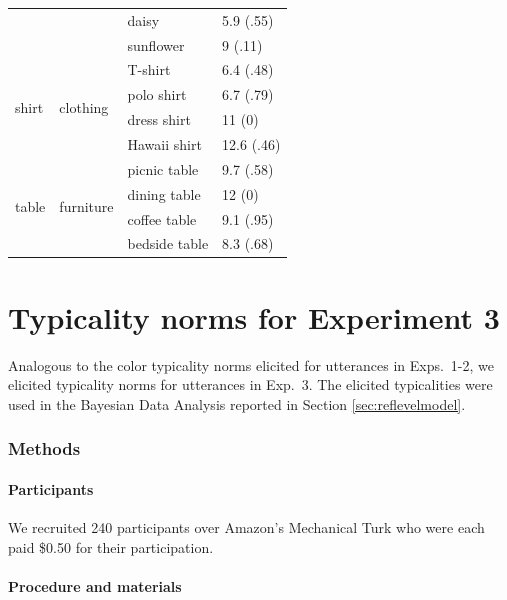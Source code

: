 \documentclass[11pt]{article}
\newcommand{\sectionref}[1]{Section \ref{#1}}
\begin{document}
\begin{table}
\begin{tabular}{l l l l}
		& & daisy & 5.9 (.55)\\
		& & sunflower & 9 (.11)\\
	\midrule
	\multirow{4}{*}{shirt} & \multirow{4}{*}{clothing} & T-shirt & 6.4 (.48)\\
		& & polo shirt & 6.7 (.79)\\
		& & dress shirt & 11 (0)\\
		& & Hawaii shirt & 12.6 (.46)\\
	\midrule
	\multirow{4}{*}{table} & \multirow{4}{*}{furniture} & picnic table & 9.7 (.58)\\
		& & dining table & 12 (0)\\
		& & coffee table & 9.1 (.95)\\
		& & bedside table & 8.3 (.68)\\				
	\bottomrule
	\end{tabular}
\end{table}


\section{Typicality norms for Experiment 3}
\label{app:typicalitynorms2}

Analogous to the color typicality norms elicited for utterances in Exps.~1-2, we elicited typicality norms for utterances in Exp.~3. The elicited typicalities were used in the Bayesian Data Analysis reported in \sectionref{sec:reflevelmodel}.

\subsubsection{Methods}

\paragraph{Participants}

We recruited 240 participants over Amazon's Mechanical Turk who were each paid \$0.50 for their participation.

\paragraph{Procedure and materials}
\end{document}
